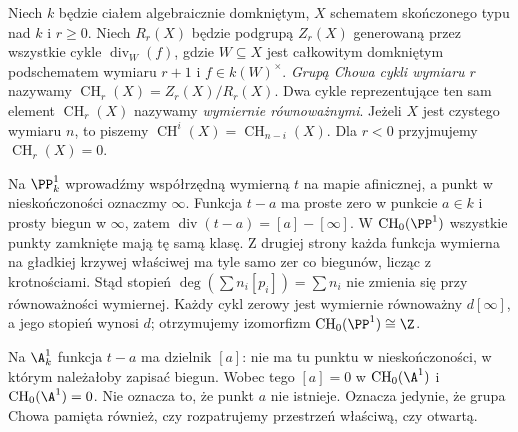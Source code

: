 \begin{definicja}
\label{def:ga7-chow}
Niech $k$ będzie ciałem algebraicznie domkniętym,
$X$ schematem skończonego typu nad $k$ i $r\ge0$.
Niech $R_r(X)$ będzie podgrupą $Z_r(X)$ generowaną przez
wszystkie cykle $\operatorname{div}_W(f)$, gdzie
$W\subseteq X$ jest całkowitym domkniętym podschematem
wymiaru $r+1$ i $f\in k(W)^\times$.
\emph{Grupą Chowa cykli wymiaru $r$} nazywamy
$\operatorname{CH}_r(X)=Z_r(X)/R_r(X)$.
Dwa cykle reprezentujące ten sam element $\operatorname{CH}_r(X)$
nazywamy \emph{wymiernie równoważnymi}.
Jeżeli $X$ jest czystego wymiaru $n$, to piszemy
$\operatorname{CH}^i(X)=\operatorname{CH}_{n-i}(X)$.
Dla $r<0$ przyjmujemy $\operatorname{CH}_r(X)=0$.
\end{definicja}

\begin{przyklad}
\label{prz:ga7-p1-points}
Na $\PP^1_k$ wprowadźmy współrzędną wymierną $t$ na
mapie afinicznej, a punkt w nieskończoności oznaczmy
$\infty$. Funkcja $t-a$ ma proste zero w punkcie $a\in k$
i prosty biegun w $\infty$, zatem
$\operatorname{div}(t-a)=[a]-[\infty]$.
W $\operatorname{CH}_0(\PP^1)$ wszystkie punkty zamknięte
mają tę samą klasę. Z drugiej strony każda funkcja wymierna
na gładkiej krzywej właściwej ma tyle samo zer co biegunów,
licząc z krotnościami. Stąd stopień
$\deg(\sum n_i[p_i])=\sum n_i$ nie zmienia się przy
równoważności wymiernej. Każdy cykl zerowy jest wymiernie
równoważny $d[\infty]$, a jego stopień wynosi $d$;
otrzymujemy izomorfizm $\operatorname{CH}_0(\PP^1)\cong\Z$.
\end{przyklad}

\begin{przyklad}
\label{prz:ga7-a1-chow0}
Na $\A^1_k$ funkcja $t-a$ ma dzielnik $[a]$:
nie ma tu punktu w nieskończoności, w którym należałoby
zapisać biegun. Wobec tego $[a]=0$ w
$\operatorname{CH}_0(\A^1)$ i $\operatorname{CH}_0(\A^1)=0$.
Nie oznacza to, że punkt $a$ nie istnieje. Oznacza jedynie,
że grupa Chowa pamięta również, czy rozpatrujemy przestrzeń
właściwą, czy otwartą.
\end{przyklad}


